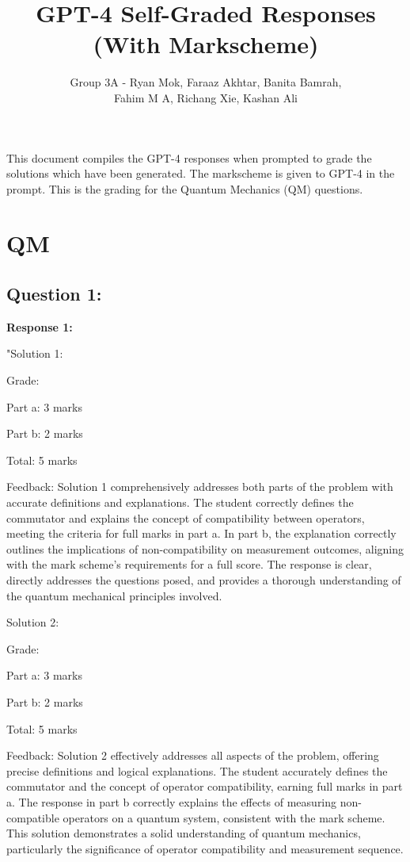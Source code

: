 \documentclass[a4paper,11pt]{article}
\begin{document}
\title{GPT-4 Self-Graded Responses (With Markscheme)}
\author{Group 3A - Ryan Mok, Faraaz Akhtar, Banita Bamrah, \\ Fahim M A, Richang Xie, Kashan Ali }
\date{}
\maketitle

This document compiles the GPT-4 responses when prompted to grade the solutions which have been generated. The markscheme is given to GPT-4 in the prompt. This is the grading for the Quantum Mechanics (QM) questions. 

\section{QM}

\subsection*{Question 1:}

\textbf{Response 1:}

"Solution 1:

Grade:

Part a: 3 marks

Part b: 2 marks

Total: 5 marks

Feedback:
Solution 1 comprehensively addresses both parts of the problem with accurate definitions and explanations. The student correctly defines the commutator and explains the concept of compatibility between operators, meeting the criteria for full marks in part a. In part b, the explanation correctly outlines the implications of non-compatibility on measurement outcomes, aligning with the mark scheme's requirements for a full score. The response is clear, directly addresses the questions posed, and provides a thorough understanding of the quantum mechanical principles involved.

Solution 2:

Grade:

Part a: 3 marks

Part b: 2 marks

Total: 5 marks

Feedback:
Solution 2 effectively addresses all aspects of the problem, offering precise definitions and logical explanations. The student accurately defines the commutator and the concept of operator compatibility, earning full marks in part a. The response in part b correctly explains the effects of measuring non-compatible operators on a quantum system, consistent with the mark scheme. This solution demonstrates a solid understanding of quantum mechanics, particularly the significance of operator compatibility and measurement sequence.
\end{document}
